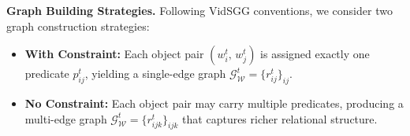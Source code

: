 
\noindent \textbf{Graph Building Strategies.} Following VidSGG conventions, we consider two
graph construction strategies:
\begin{itemize}[nosep]
    \item [--] \textbf{With Constraint:} Each object pair
    $\left(w_{i}^{t},\, w_{j}^{t}\right)$ is assigned exactly one predicate
    $p^t_{ij}$, yielding a single-edge graph
    $\mathcal{G}_{\mathcal{W}}^t = \{r_{ij}^t\}_{ij}$.
    \item [--] \textbf{No Constraint:} Each object pair may carry multiple
    predicates, producing a multi-edge graph
    $\mathcal{G}_{\mathcal{W}}^t = \{r_{ijk}^{t}\}_{ijk}$ that captures
    richer relational structure.
\end{itemize}
